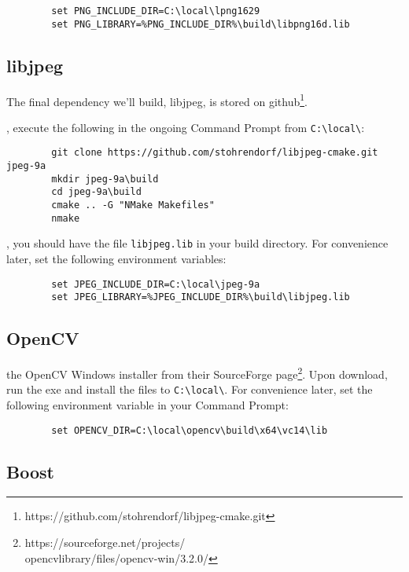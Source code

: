 \documentclass{tufte-handout}
\begin{document}
    \begin{lstlisting}
        set PNG_INCLUDE_DIR=C:\local\lpng1629
        set PNG_LIBRARY=%PNG_INCLUDE_DIR%\build\libpng16d.lib
    \end{lstlisting}

\subsection{libjpeg}

    The final dependency we'll build, libjpeg,  is stored on 
    github\footnote{https://github.com/stohrendorf/libjpeg-cmake.git}.

    , execute the following in the ongoing Command Prompt 
    from \Verb|C:\local\|:

    \begin{lstlisting}
        git clone https://github.com/stohrendorf/libjpeg-cmake.git jpeg-9a
        mkdir jpeg-9a\build
        cd jpeg-9a\build
        cmake .. -G "NMake Makefiles"
        nmake
    \end{lstlisting}

    , you should have the file \Verb|libjpeg.lib| in your build
    directory.  For convenience later, set the following environment variables:

    \begin{lstlisting}
        set JPEG_INCLUDE_DIR=C:\local\jpeg-9a
        set JPEG_LIBRARY=%JPEG_INCLUDE_DIR%\build\libjpeg.lib
    \end{lstlisting}

\subsection{OpenCV}

     the OpenCV Windows installer from their SourceForge 
    page\footnote{https://sourceforge.net/projects/\\ opencvlibrary/files/opencv-win/3.2.0/}.  Upon
    download, run the exe and install the files to \Verb|C:\local\|.  For convenience later,
    set the following environment variable in your Command Prompt:

    \begin{lstlisting}
        set OPENCV_DIR=C:\local\opencv\build\x64\vc14\lib
    \end{lstlisting}

\subsection{Boost}
\end{document}
